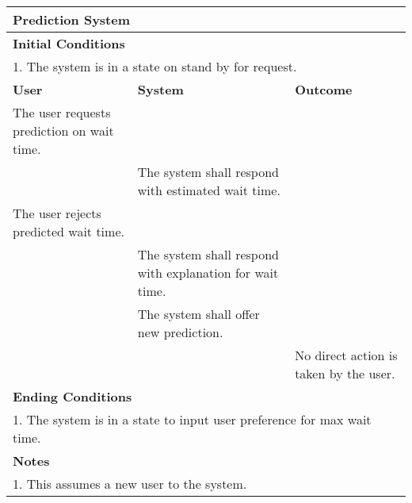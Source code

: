 \documentclass{article}
\begin{document}
\begin{tabular}{ | m{128pt} | m{128pt}| m{128pt} | }
    \hline
    \multicolumn{3}{|l|}{Prediction System} \\
    \hline
    \multicolumn{3}{|l|}{\textbf{Initial Conditions}} \\
    \hline
    \multicolumn{3}{|l|}{1. The system is in a state on stand by for request.} \\
    \hline
    \textbf{User} & \textbf{System} & \textbf{Outcome} \\ 
    \hline
    The user requests prediction on wait time. & \space & \space \\ 
    \hline
    \space & The system shall respond with estimated wait time. & \space \\ 
    \hline
    The user rejects predicted wait time. & \space & \space \\ 
    \hline
    \space & The system shall respond with explanation for wait time. & \space \\ 
    \hline
    \space & The system shall offer new prediction. & \space \\ 
    \hline
    \space & \space & No direct action is taken by the user. \\ 
    \hline
    \multicolumn{3}{|l|}{\textbf{Ending Conditions}} \\
    \hline
    \multicolumn{3}{|l|}{1. The system is in a state to input user preference for max wait time.} \\
    \hline
    \multicolumn{3}{|l|}{\textbf{Notes}} \\
    \hline
    \multicolumn{3}{|l|}{1. This assumes a new user to the system.} \\
    \hline
\end{tabular}

\\~\\
\end{document}
